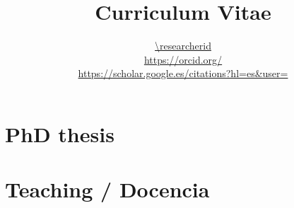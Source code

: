 \documentclass{article}
\title{Curriculum Vitae}
\author{
  \begin{tabular}{c}
      \\
    \url{\researcherid} \\
    \url{https://orcid.org/} \\
    \url{https://scholar.google.es/citations?hl=es&user=}
  \end{tabular}
}
\begin{document}
\maketitle

\renewcommand{\refname}{Journal papers / Artículos en revistas}


\renewcommand{\refname}{Conference papers / Ponencias en congresos}


\renewcommand{\refname}{Books / Libros}


\renewcommand{\refname}{Book chapters / Capítulos de libro}


\renewcommand{\refname}{Projects / Proyectos}


\renewcommand{\refname}{Contracts / Contratos}


\renewcommand{\refname}{Phd thesis supervision / Supervisión de tesis}


\section*{PhD thesis}


\section*{Teaching / Docencia}


\renewcommand{\refname}{Courses / Cursos impartidos}


\renewcommand{\refname}{Final projects supervision / Supervisión de
  proyectos final de carrera}

\end{document}
